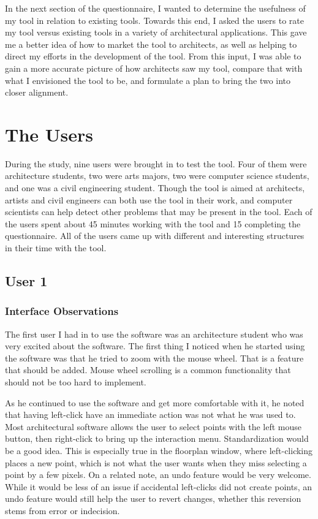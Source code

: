 \documentclass{thesis}
\begin{document}
In the next section of the questionnaire, I wanted to determine the usefulness of my tool in relation to existing tools.  Towards
this end, I asked the users to rate my tool versus existing tools in a variety of architectural applications.  This gave me a
better idea of how to market the tool to architects, as well as helping to direct my efforts in the development of the tool.
From this input, I was able to gain a more accurate picture of how architects saw my tool, compare that with what I
envisioned the tool to be, and formulate a plan to bring the two into closer alignment.

\section{The Users}
During the study, nine users were brought in to test the tool.  Four of them were architecture students, two were arts majors, two
were computer science students, and one was a civil engineering student.  Though the tool is aimed at architects, artists and civil
engineers can both use the tool in their work, and computer scientists can help detect other problems that may be present in the tool.
Each of the users spent about 45 minutes working with the tool and 15 completing the questionnaire.  All of the users came up with
different and interesting structures in their time with the tool.

\subsection{User 1}
\subsubsection{Interface Observations}
The first user I had in to use the software was an architecture student who was very excited about the software.
The first thing I noticed when he started using the software was that he tried to zoom with the mouse wheel.  That is a feature that
should be added.  Mouse wheel scrolling is a common functionality that should not be too hard to implement.

As he continued to use the software and get more comfortable with it, he noted that having left-click have an immediate action was not
what he was used to. Most architectural software allows the user to select points with the left mouse button, then right-click to
bring up the interaction menu.  Standardization would be a good idea.  This is especially true in the floorplan window, where
left-clicking places a new point, which is not what the user wants when they miss selecting a point by a few pixels.  On a related
note, an undo feature would be very welcome.  While it would be less of an issue if accidental left-clicks did not create points,
an undo feature would still help the user to revert changes, whether this reversion stems from error or indecision.
\end{document}
